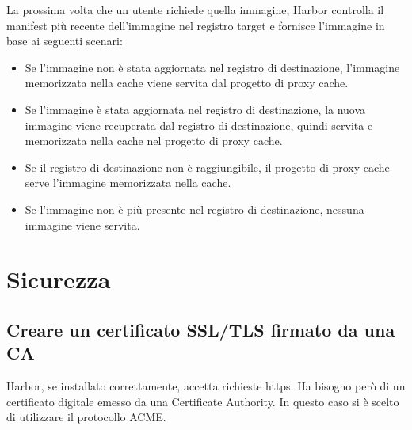 \documentclass[12pt]{report}
\begin{document}
La prossima volta che un utente richiede quella immagine, Harbor controlla il manifest più recente dell'immagine nel registro target e fornisce l'immagine in base ai seguenti scenari:
\begin{itemize}
    \item Se l'immagine non è stata aggiornata nel registro di destinazione, l'immagine memorizzata nella cache viene servita dal progetto di proxy cache.
    \item Se l'immagine è stata aggiornata nel registro di destinazione, la nuova immagine viene recuperata dal registro di destinazione, quindi servita e memorizzata nella cache nel progetto di proxy cache.
    \item Se il registro di destinazione non è raggiungibile, il progetto di proxy cache serve l'immagine memorizzata nella cache.
    \item Se l'immagine non è più presente nel registro di destinazione, nessuna immagine viene servita. 
\end{itemize}

\chapter{Sicurezza}
\section{Creare un certificato SSL/TLS firmato da una CA}
Harbor, se installato correttamente, accetta richieste https. Ha bisogno però di un certificato digitale emesso da una Certificate Authority. In questo caso si è scelto di utilizzare il protocollo ACME. 
\end{document}
